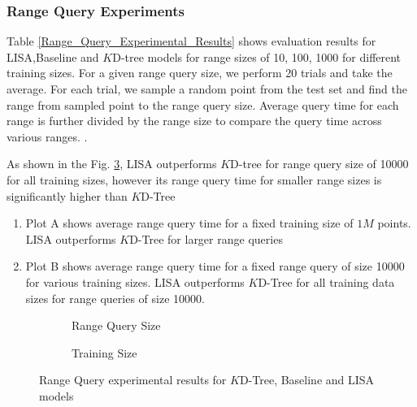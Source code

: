 \subsubsection {Range Query Experiments}
Table \ref{Range_Query_Experimental_Results} shows evaluation results for LISA,Baseline and $K$D-tree models for range sizes of 10, 100, 1000 for different training sizes. For a given range query size, we perform 20 trials and take the average. For each trial, we sample a random point from the test set and find the range from sampled point to the range query size. Average query time for each range is further divided by the range size to compare the query time across various ranges. .

	As shown in the Fig. \ref{fig:Range_Query_Comparision}, LISA outperforms $K$D-tree for range query size of 10000 for all training sizes, however its range query time for smaller range sizes is significantly higher than $K$D-Tree
	\begin{enumerate}
		\item Plot A shows average range query time for a fixed training size of $1M$ points. LISA outperforms $K$D-Tree for larger range queries
		
		\item  Plot B shows average range query time for a fixed range query of size 10000 for various training sizes. LISA outperforms $K$D-Tree for all training data sizes for range queries of size 10000.
	\end{enumerate}

\begin{figure}
 \centering
     \begin{subfigure}[b]{0.45\textwidth}
         \centering
         
         \caption{Range Query Size}
         \label{fig:2d_exp2_2_1}
     \end{subfigure}
     \hfill
     \begin{subfigure}[b]{0.45\textwidth}
         \centering
         
         \caption{Training Size}
         \label{fig:2d_exp2_2_2}
     \end{subfigure}
     \hfill
     \caption{Range Query experimental results for $K$D-Tree, Baseline and LISA models}
        \label{fig:Range_Query_Comparision}
\end{figure}

